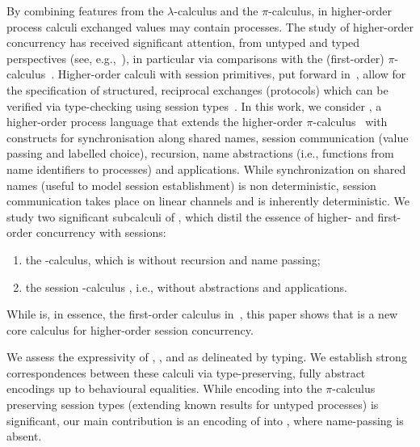 By combining features from the $\lambda$-calculus and the $\pi$-calculus, 
in {higher-order process calculi} exchanged values may contain  processes. 
The study of higher-order concurrency has received significant attention, 
from untyped and typed perspectives (see, e.g.,~\cite{ThomsenB:plachoasgcfhop,SangiorgiD:expmpa,San96int,MostrousY15,DBLP:journals/iandc/LanesePSS11,DBLP:conf/icalp/LanesePSS10,DBLP:conf/esop/KoutavasH11,XuActa2012}),
in particular via comparisons with the (first-order) $\pi$-calculus~\cite{MilnerR:calmp1}. 
Higher-order calculi with {session primitives}, put forward in~\cite{tlca07,DBLP:journals/jfp/GayV10},
allow for the specification of structured, reciprocal exchanges (protocols) 
which can be verified via type-checking using {session types}~\cite{honda.vasconcelos.kubo:language-primitives}.
In this work, we consider \HOp, a higher-order process language that 
extends the higher-order $\pi$-calculus~\cite{SangiorgiD:expmpa} with 
constructs for 
synchronisation along shared names, 
session communication (value passing and labelled choice),
recursion, 
name abstractions (i.e., functions from name identifiers  to processes)
and applications.
While synchronization on shared names (useful to model session establishment) is 
non deterministic, session communication takes place on linear channels
and is inherently deterministic. 
We study two significant subcalculi of \HOp, 
which distil the essence of higher- and first-order concurrency with sessions:
\begin{enumerate}[-]
\item the \HO-calculus, which is \HOp without recursion and name passing;
\item the session \sessp-calculus , i.e., \HOp without abstractions and applications.  
\end{enumerate}
While \sessp is, 
in essence, the first-order calculus in~\cite{honda.vasconcelos.kubo:language-primitives}, 
this paper shows that \HO  is a new core calculus 
for higher-order session concurrency.

We assess the expressivity 
 of \HOp, \HO, and \sessp as delineated by typing. 
We establish strong correspondences between 
these calculi  via type-preserving, fully abstract encodings up to 
behavioural equalities. While encoding \HOp 
into the $\pi$-calculus preserving session types 
(extending  known  results for untyped processes) is 
significant, 
our main contribution is 
an encoding of \HOp into \HO, where name-passing is absent.  

